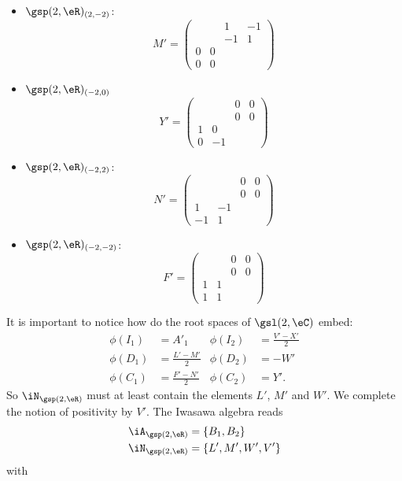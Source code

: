 \begin{itemize}
\[	      \]
	\item $\gsp(2,\eR)_{(2,-2)}$:
	      \[
		      M'=
		      \begin{pmatrix}
			        &   & 1  & -1 \\
			        &   & -1 & 1  \\
			      0 & 0           \\0&0
		      \end{pmatrix}
	      \]
	\item $\gsp(2,\eR)_{(-2,0)}$
	      \[
		      Y'=
		      \begin{pmatrix}
			        &   & 0 & 0 \\&&0&0\\
			      1 & 0         \\0&-1
		      \end{pmatrix}
	      \]
	\item $\gsp(2,\eR)_{(-2,2)}$:
	      \[
		      N'=\begin{pmatrix}
			         &    & 0 & 0 \\&&0&0\\
			      1  & -1         \\
			      -1 & 1
		      \end{pmatrix}
	      \]
	\item $\gsp(2,\eR)_{(-2,-2)}$:
	      \[
		      F'=\begin{pmatrix}
			        &   & 0 & 0 \\
			        &   & 0 & 0 \\
			      1 & 1         \\
			      1 & 1
		      \end{pmatrix}
	      \]
\end{itemize}
It is important to notice how do the root spaces of $\gsl(2,\eC)$ embed:
\begin{align}
	\phi(I_1) & =A'_1              & \phi(I_2) & =\frac{ V'-X' }{ 2 } \\
	\phi(D_1) & =\frac{ L'-M' }{2} & \phi(D_2) & =-W'                 \\
	\phi(C_1) & =\frac{ F'-N' }{2} & \phi(C_2) & =Y'.
\end{align}
So $\iN_{\gsp(2,\eR)}$ must at least contain the elements $L'$, $M'$ and $W'$. We complete the notion of positivity by $V'$. The Iwasawa algebra reads
\[
	\begin{split}
		\iA_{\gsp(2,\eR)}&=\{ B_1,B_2 \}\\
		\iN_{\gsp(2,\eR)}&=\{ L',M',W',V' \}
	\end{split}
\]
with
